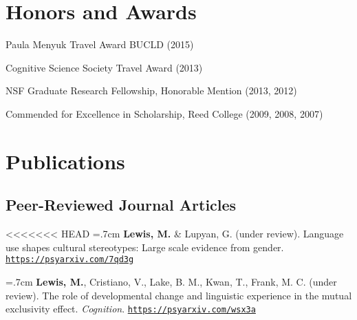 \documentclass[letterpaper]{article}
\renewenvironment{itemize}{
  \begin{list}{}{
    \setlength{\leftmargin}{1.5em}
  }
}{
  \end{list}
}
\begin{document}



\section*{Honors and Awards}
\begin{itemize}
\item Paula Menyuk Travel Award BUCLD (2015)
\item Cognitive Science Society Travel Award (2013)
\item NSF Graduate Research Fellowship, Honorable Mention (2013, 2012)
\item Commended for Excellence in Scholarship, Reed College (2009, 2008, 2007)
\end{itemize}




\section*{Publications}

\subsection*{Peer-Reviewed Journal Articles}

\onehalfspacing


<<<<<<< HEAD
\hangindent=.7cm {\bf Lewis, M.} \& Lupyan, G. (under review). Language use shapes cultural stereotypes: Large scale evidence from gender. \href{https://psyarxiv.com/7qd3g}{\tt https://psyarxiv.com/7qd3g}

\hangindent=.7cm {\bf Lewis, M.}, Cristiano, V., Lake, B. M., Kwan, T., Frank, M. C. (under review). The role of developmental change and linguistic experience in the mutual exclusivity effect. {\it Cognition}. \href{https://psyarxiv.com/wsx3a}{\tt https://psyarxiv.com/wsx3a}
\end{document}
